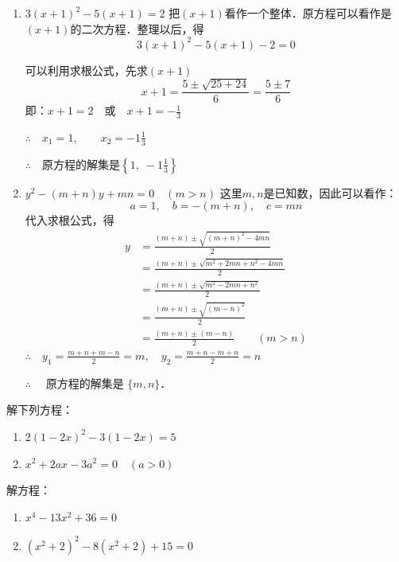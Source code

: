 \begin{solution}
\begin{enumerate}
    \item $3(x+1)^2-5(x+1)=2$
    把$(x+1)$看作一个整体．原方程可以看作是
    $(x+1)$的二次方程．整理以后，得
   \[3(x+1)^2-5(x+1)-2=0\] 

   可以利用求根公式，先求$(x+1)$
\[x+1=\frac{5\pm \sqrt{25+24}}{6}=\frac{5\pm 7}{6}\]
即：$x+1=2\quad \text{或}\quad x+1=-\frac{1}{3}$

$\therefore\quad x_1=1,\qquad x_2=-1\frac{1}{3}$

$\therefore\quad$原方程的解集是$\left\{1,\; -1\frac{1}{3}\right\}$

\item $y^2-(m+n)y+mn=0\quad (m>n)$
这里$m,n$是已知数，因此可以看作：
\[a=1,\quad b=-(m+n),\quad c=mn\]
代入求根公式，得
\[\begin{split}
        y &=\frac{(m+n) \pm \sqrt{(m+n)^{2}-4 m n}}{2} \\
        &=\frac{(m+n) \pm \sqrt{m^{2}+2 m n+n^{2}-4 m n}}{2} \\
        &=\frac{(m+n) \pm \sqrt{m^{2}-2 m n+n^{2}}}{2} \\
        &=\frac{(m+n) \pm \sqrt{(m-n)^{2}}}{2}\\
        &=\frac{(m+n) \pm(m-n)}{2} \qquad (m>n)
\end{split}\]
$\therefore\quad y_1=\frac{m+n+m-n}{2}=m,\quad y_2=\frac{m+n-m+n}{2}=n$

$\therefore\quad $ 原方程的解集是 $\{m,n\}$．
    \end{enumerate}
\end{solution}

\begin{ex}
    解下列方程：
    \begin{enumerate}
        \item $2(1-2x)^2-3(1-2x)=5$
        \item $x^2+2ax-3a^2=0\quad  (a>0)$
    \end{enumerate}
\end{ex}


\begin{example}
    解方程：
\begin{enumerate}
    \item $x^4-13x^2+36=0$
    \item $(x^2+2)^2-8(x^2+2)+15=0$
\end{enumerate}
\end{example}

